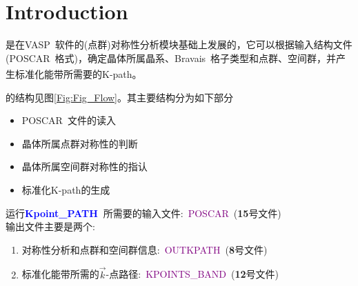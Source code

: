 \documentclass{article}      %
\newcommand{\upcite}[1]{\hspace{0ex}\textsuperscript{\cite{#1}}} %
\begin{document}

\tableofcontents %
\newpage
\section{Introduction}
是在\textrm{VASP~}软件的(点群)对称性分析模块基础上发展的，它可以根据输入结构文件(\textrm{POSCAR~}格式)，确定晶体所属晶系、\textrm{Bravais~}格子类型和点群、空间群，并产生标准化能带所需要的\textrm{K-path}\upcite{CMS49-299_2010}。

的结构见图\ref{Fig:Fig_Flow}。其主要结构分为如下部分
\begin{itemize}
	\item \textrm{POSCAR~}文件的读入
	\item 晶体所属点群对称性的判断
	\item 晶体所属空间群对称性的指认
	\item 标准化\textrm{K-path}的生成
\end{itemize}

运行\textcolor{blue}{\textbf{Kpoint\_PATH~}}所需要的输入文件:~\;\;\textcolor{purple}{\textrm{POSCAR~}}(\textbf{15}号文件)\\
输出文件主要是两个:~
\begin{enumerate}
	\item 对称性分析和点群和空间群信息:~\textcolor{purple}{\textrm{OUTKPATH~}}(\textbf{8}号文件)
	\item 标准化能带所需的$\vec k$-点路径:~\textcolor{purple}{\textrm{KPOINTS\_BAND~}}(\textbf{12}号文件)
\end{enumerate}
\end{document}
